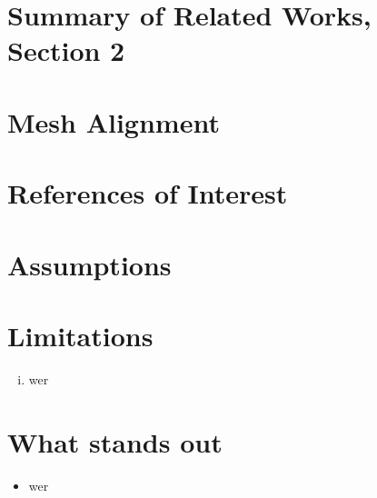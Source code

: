 \documentclass{article}
\begin{document}
\section{Summary of Related Works, Section 2}

\section{Mesh Alignment}
% 


\section{References of Interest}

\section{Assumptions}

\section{Limitations}
\begin{enumerate}[(i)]
	\item wer
\end{enumerate}

\section{What stands out}
\begin{itemize}
	\item wer
\end{itemize}
\end{document}

